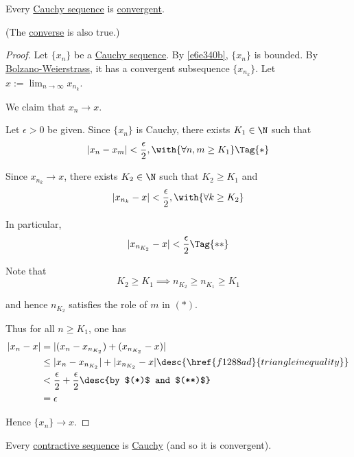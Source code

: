 \label{a537c7e}

Every \href{a8f670d}{Cauchy sequence} is \href{de3e28a}{convergent}.

(The \href{a1534e3}{converse} is also true.)

\begin{proof}
  Let $\{x_n\}$ be a \href{a8f670d}{Cauchy sequence}. By \autoref{e6e340b},
  $\{x_n\}$ is bounded. By \href{d277ad0}{Bolzano-Weierstrass}, it has a
  convergent subsequence $\{x_{n_k}\}$. Let $x:=\lim_{n\to\infty}x_{n_k}$.

  We claim that $x_n\to x$.

  Let $\epsilon>0$ be given. Since $\{x_n\}$ is Cauchy, there exists $K_1\in\N$
  such that
  \begin{equation*}
    |x_n-x_m|<\frac\epsilon2,\with{\forall n,m\geq K_1}\Tag{*}
  \end{equation*}

  Since $x_{n_k}\to x$, there exists $K_2\in\N$ such that $K_2\geq K_1$ and
  \begin{equation*}
    |x_{n_k}-x|<\frac\epsilon2,\with{\forall k\geq K_2}
  \end{equation*}

  In particular,
  \begin{equation*}
    |x_{n_{K_2}}-x|<\frac\epsilon2\Tag{**}
  \end{equation*}

  Note that
  $$
    K_2\geq K_1\implies n_{K_2}\geq n_{K_1}\geq K_1
  $$

  and hence $n_{K_2}$ satisfies the role of $m$ in $(*)$.

  Thus for all $n\geq K_1$, one has
  \begin{align*}
    |x_n-x|
     &=|(x_n-x_{n_{K_2}})+(x_{n_{K_2}}-x)|                                            \\
     &\leq|x_n-x_{n_{K_2}}|+|x_{n_{K_2}}-x|\desc{\href{f1288ad}{triangle inequality}} \\
     &<\frac\epsilon2+\frac\epsilon2\desc{by $(*)$ and $(**)$}                        \\
     &=\epsilon
  \end{align*}

  Hence $\{x_n\}\to x$.
\end{proof}

\label{ac20bfc}

Every \href{d5c8fb8}{contractive sequence} is \href{a8f670d}{Cauchy} (and so it
is convergent).

